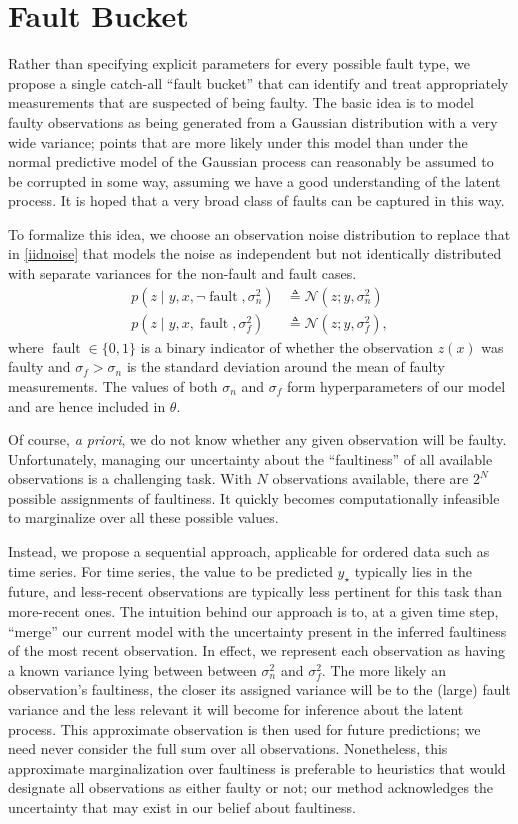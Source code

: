 \documentclass{article}
\newcommand{\deq}{\ensuremath{\triangleq}}
\newcommand{\given}{\ensuremath{\mid}}
\newcommand{\cm}[1]{\ensuremath{\mathcal{#1}}}
\newcommand{\st}{_{\star}}
\DeclareMathOperator{\fault}{fault}
\begin{document}
\section{Fault Bucket}\label{bucket}

Rather than specifying explicit parameters for every possible fault
type, we propose a single catch-all ``fault bucket'' that can identify
and treat appropriately measurements that are suspected of being
faulty.  The basic idea is to model faulty observations as being
generated from a Gaussian distribution with a very wide variance;
points that are more likely under this model than under the normal
predictive model of the Gaussian process can reasonably be assumed to
be corrupted in some way, assuming we have a good understanding of the
latent process. It is hoped that a very broad class of faults can be
captured in this way.

To formalize this idea, we choose an observation noise distribution to
replace that in \eqref{iidnoise} that models the noise as independent
but not identically distributed with separate variances for the
non-fault and fault cases.
\begin{align*}
 p(z \given y, x, \neg\fault, \sigma_n^2)
 &
 \deq
 \cm{N}(z; y, \sigma_n^2)
 \\
 p(z \given y, x, \fault, \sigma_f^2)
 &
 \deq
 \cm{N}(z; y, \sigma_f^2),
\end{align*}
where $\fault \in \lbrace 0, 1 \rbrace$ is a binary indicator of
whether the observation $z(x)$ was faulty and $\sigma_f > \sigma_n$ is
the standard deviation around the mean of faulty measurements.  The
values of both $\sigma_n$ and $\sigma_f$ form hyperparameters of our
model and are hence included in $\theta$.

Of course, {\it a priori}, we do not know whether any given
observation will be faulty.  Unfortunately, managing our uncertainty
about the ``faultiness'' of all available observations is a
challenging task. With $N$ observations available, there are $2^N$
possible assignments of faultiness. It quickly becomes computationally
infeasible to marginalize over all these possible values.

Instead, we propose a sequential approach, applicable for ordered data
such as time series. For time series, the value to be predicted $y\st$
typically lies in the future, and less-recent observations are
typically less pertinent for this task than more-recent ones. The
intuition behind our approach is to, at a given time step, ``merge''
our current model with the uncertainty present in the inferred
faultiness of the most recent observation. In effect, we represent
each observation as having a known variance lying between between
$\sigma_n^2$ and $\sigma_f^2$. The more likely an observation's
faultiness, the closer its assigned variance will be to the (large)
fault variance and the less relevant it will become for inference
about the latent process. This approximate observation is then used
for future predictions; we need never consider the full sum over all
observations. Nonetheless, this approximate marginalization over
faultiness is preferable to heuristics that would designate all
observations as either faulty or not; our method acknowledges the
uncertainty that may exist in our belief about faultiness.
\end{document}
